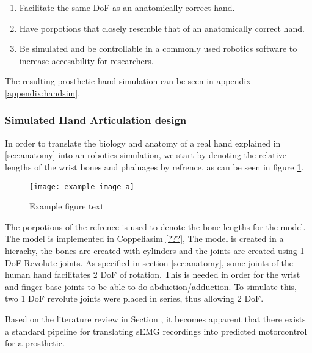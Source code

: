 \documentclass[../main.tex]{subfiles}
\begin{document}
\begin{enumerate}
\item Facilitate the same DoF as an anatomically correct hand.
\item Have porpotions that closely resemble that of an anatomically correct hand.
\item Be simulated and be controllable in a commonly used robotics software to increase accesability for researchers.
\end{enumerate}

The resulting prosthetic hand simulation can be seen in appendix \ref{appendix:handsim}.

\subsubsection{Simulated Hand Articulation design}

In order to translate the biology and anatomy of a real hand explained in \ref{sec:anatomy} into an robotics simulation, we start by denoting the relative lengths of the wrist bones and phalnages by refrence, as can be seen in figure \ref{fig:handref}.

\begin{figure}[h]
\begin{center}
\texttt{[image: example-image-a]}
\caption{Example figure text}
\label{fig:handref}
\end{center}
\end{figure}

The porpotions of the refrence is used to denote the bone lengths for the model.
The model is implemented in Coppeliasim \ref{???}, The model is created in a hierachy, the bones are created with cylinders and the joints are created using 1 DoF Revolute joints.
As specified in section \ref{sec:anatomy}, some joints of the human hand facilitates 2 DoF of rotation.
This is needed in order for the wrist and finger base joints to be able to do \gls{abduction/adduction}.
To simulate this, two 1 DoF revolute joints were placed in series, thus allowing 2 DoF.



Based on the literature review in Section \label{sec:literature}, it becomes apparent that there exists a standard pipeline for translating sEMG recordings into predicted motorcontrol for a prosthetic.
\end{document}
